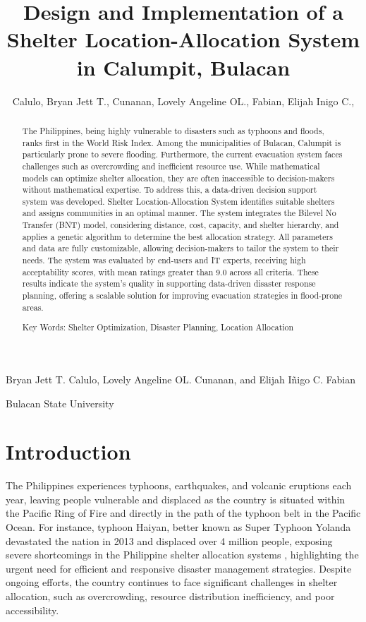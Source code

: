 \documentclass[11pt,letterpaper,]{article}
\title{Design and Implementation of a Shelter Location-Allocation System in Calumpit, Bulacan}
\author{Calulo, Bryan Jett T., Cunanan, Lovely Angeline OL., Fabian, Elijah Inigo C.,}
\begin{document}
{
	
	\vspace{6pt}
	
	Bryan Jett T. Calulo, Lovely Angeline OL. Cunanan, and Elijah Iñigo C. Fabian
	
	\vspace{6pt}
	
	Bulacan State University
	
\par}


\begin{abstract}
	The Philippines, being highly vulnerable to disasters such as typhoons and floods, ranks first in the World Risk Index. Among the municipalities of Bulacan, Calumpit is particularly prone to severe flooding. Furthermore, the current evacuation system faces challenges such as overcrowding and inefficient resource use. While mathematical models can optimize shelter allocation, they are often inaccessible to decision-makers without mathematical expertise. To address this, a data-driven decision support system was developed. Shelter Location-Allocation System identifies suitable shelters and assigns communities in an optimal manner. The system integrates the Bilevel No Transfer (BNT) model, considering distance, cost, capacity, and shelter hierarchy, and applies a genetic algorithm to determine the best allocation strategy. All parameters and data are fully customizable, allowing decision-makers to tailor the system to their needs. The system was evaluated by end-users and IT experts, receiving high acceptability scores, with mean ratings greater than 9.0 across all criteria. These results indicate the system’s quality in supporting data-driven disaster response planning, offering a scalable solution for improving evacuation strategies in flood-prone areas.
	
	\vspace{6pt}
	\noindent Key Words: \normalfont Shelter Optimization, Disaster Planning, Location Allocation
\end{abstract}

\onehalfspacing

\section{Introduction}
	The Philippines experiences typhoons, earthquakes, and volcanic eruptions each year, leaving people vulnerable and displaced as the country is situated within the Pacific Ring of Fire and directly in the path of the typhoon belt in the Pacific Ocean. For instance, typhoon Haiyan, better known as Super Typhoon Yolanda devastated the nation in 2013 and displaced over 4 million people, exposing severe shortcomings in the Philippine shelter allocation systems \parencite{Iuchi2019}, highlighting the urgent need for efficient and responsive disaster management strategies. Despite ongoing efforts, the country continues to face significant challenges in shelter allocation, such as overcrowding, resource distribution inefficiency, and poor accessibility.
	
\end{document}
